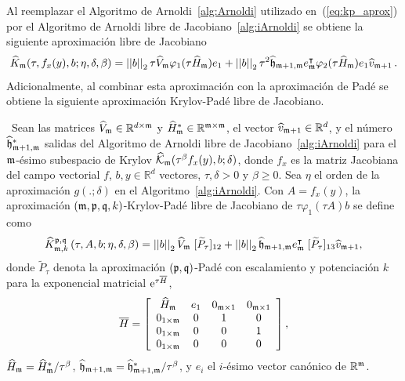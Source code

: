 Al reemplazar el Algoritmo de Arnoldi~\ref{alg:Arnoldi} utilizado en~(\ref{eq:kp_aprox}) por el Algoritmo de Arnoldi libre de Jacobiano~\ref{alg:iArnoldi} se obtiene la siguiente aproximación libre de Jacobiano
 \begin{equation*}
	\widehat{K}_{\mathfrak{m}}(\tau,f_x(y) , b ; \eta, \delta, \beta) = \left\lvert \left\lvert  b  \right\rvert \right\rvert_2\tau \widehat{V}_{\mathfrak{m}}\varphi_1(\tau \widehat{H}_{\mathfrak{m}})e_1 + \left\lvert \left\lvert  b  \right\rvert \right\rvert_2\tau^2\widehat{\mathfrak{h}}_{\mathfrak{m}+1,\mathfrak{m}}e^\intercal_{\mathfrak{m}}\varphi_2(\tau \widehat{H}_{\mathfrak{m}})e_1\widehat{v}_{\mathfrak{m}+1}\,.
\end{equation*}
Adicionalmente, al combinar esta aproximación con la aproximación de Padé se obtiene la siguiente aproximación Krylov-Padé libre de Jacobiano.
\begin{definition}\label{def:gen_kp_aprox_fj}
	\cite{naranjo2023jacobian}~Sean las matrices $\widehat{V}_{\mathfrak{m}}\in\mathbb{R}^{d\times \mathfrak{m}}$ y $\widehat{H}^*_{\mathfrak{m}}\in\mathbb{R}^{{\mathfrak{m}} \times {\mathfrak{m}}}$, el vector $\widehat{v}_{\mathfrak{m}+1}\in\mathbb{R}^d$, y el número  $ \widehat{\mathfrak{h}}^*_{\mathfrak{m}+1,\mathfrak{m}}$ salidas del Algoritmo de Arnoldi libre de Jacobiano~\ref{alg:iArnoldi} para el $\mathfrak{m}$-ésimo subespacio de Krylov $\widehat{\mathcal{K}}_{\mathfrak{m}}(\tau^\beta f_x(y),b;\delta)$, donde $f_x$ es la matriz Jacobiana del campo vectorial $f$, $b,y\in\mathbb{R}^d$ vectores, $\tau,\delta>0$ y $\beta \ge 0$. Sea $\eta$ el orden de la aproximación $g(.;\delta)$ en el Algoritmo~\ref{alg:iArnoldi}. Con $A=f_x(y)$, la aproximación $(\mathfrak{m} , \mathfrak{p} ,\mathfrak{q} , k)$-Krylov-Padé libre de Jacobiano de $\tau \varphi_1(\tau A)b$ se define como
	\begin{equation} \label{eq:gen_kp_aprox_fj}
		\widehat{K}_{\mathfrak{m},k}^{\mathfrak{p},\mathfrak{q}}\left(\tau, A , b ; \eta, \delta, \beta \right)=\left\lvert \left\lvert b \right\rvert \right\rvert_2 \widehat{V}_{\mathfrak{m}}\;[\widetilde{P}_{\tau}]_{12} + \left\lvert \left\lvert b \right\rvert \right\rvert_2 \widehat{\mathfrak{h}}_{\mathfrak{m}+1,\mathfrak{m}}e_{\mathfrak{m}}^\intercal\;[\widetilde{P}_{\tau}]_{13} \widehat{v}_{\mathfrak{m}+1},
	\end{equation}
	donde $\widetilde{P}_{\tau}$ denota la aproximación $(\mathfrak{p},\mathfrak{q})$-Padé con escalamiento y potenciación $k$ para la exponencial matricial $\mathrm{e}^{\tau\overline{H}}$,
	\begin{equation}
		\overline{H} = \left[\begin{array}{cccc}
			\widehat{H}_{\mathfrak{m}} & e_1 & 0_{\mathfrak{m}\times 1} & 0_{\mathfrak{m}\times 1}\\
			0_{1\times\mathfrak{m}} & 0 & 1 & 0\\
			0_{1\times\mathfrak{m}} & 0 & 0 & 1\\
			0_{1\times\mathfrak{m}} & 0 & 0 & 0
		\end{array}\right],
	\end{equation}
	$\widehat{H}_{\mathfrak{m}}=\widehat{H}^*_{\mathfrak{m}}/\tau^\beta$, $\widehat{\mathfrak{h}}_{\mathfrak{m}+1,\mathfrak{m}}=\widehat{\mathfrak{h}}^*_{\mathfrak{m}+1,\mathfrak{m}}/\tau^\beta$, y $e_i$ el $i$-ésimo vector canónico de $\mathbb{R}^{\mathfrak{m}}$.
\end{definition}

